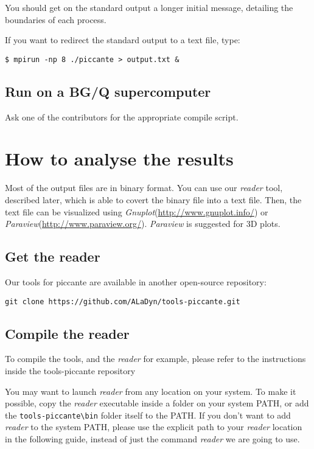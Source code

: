 \documentclass[11pt,a4paper]{report}
\begin{document}
You should get on the standard output a longer initial message, detailing the boundaries of each process.

If you want to redirect the standard output to a text file, type:

\begin{verbatim}
$ mpirun -np 8 ./piccante > output.txt &
\end{verbatim}

\section{Run on a BG/Q supercomputer}
Ask one of the contributors for the appropriate compile script.

\chapter{How to analyse the results}\label{chapter_howtoanalyse}
Most of the output files are in binary format. You can use our \emph{reader} tool, described later, which is able to covert the binary file into a text file. Then, the text file can be visualized using \emph{Gnuplot}(\url{http://www.gnuplot.info/}) or \emph{Paraview}(\url{http://www.paraview.org/}). \emph{Paraview} is suggested for 3D plots.

\section{Get the reader}
Our tools for piccante are available in another open-source repository:
\begin{verbatim}
git clone https://github.com/ALaDyn/tools-piccante.git
\end{verbatim}

\section{Compile the reader}
To compile the tools, and the \emph{reader} for example, please refer to the instructions inside the tools-piccante repository

You may want to launch \emph{reader} from any location on your system. To make it possible, copy the \emph{reader} executable inside a folder on your system PATH, or add the \verb+tools-piccante\bin+ folder itself to the PATH\@. If you don't want to add \emph{reader} to the system PATH, please use the explicit path to your \emph{reader} location in the following guide, instead of just the command \emph{reader} we are going to use.
\end{document}
